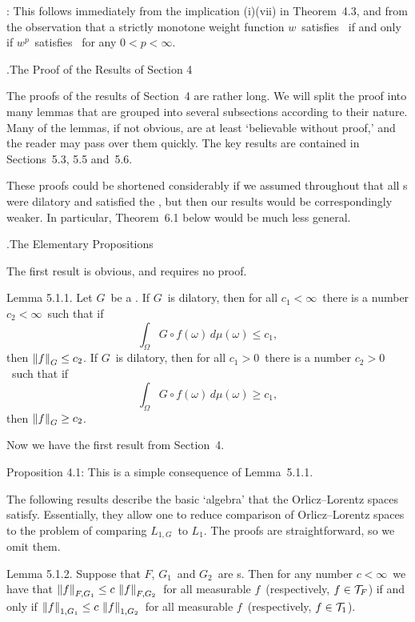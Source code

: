\Proof: This follows immediately from the implication (i)\implies(vii) in
Theorem~4.3, and from the observation that a strictly monotone weight
function $w$\ satisfies \conditionL\ if and only if $w^p$\ satisfies
\conditionL\ for any $0<p<\infty$. 
\endproof

.\enspace The Proof of the Results of Section 4

The proofs of the results of Section~4 are rather long. We will split the proof
into many lemmas that are grouped into several subsections
according to their nature. Many of the lemmas, if not obvious, are at least
`believable without proof,' and the reader may pass over them quickly. The key
results are contained in Sections~5.3, 5.5 and~5.6.

These proofs could be shortened considerably if we assumed throughout
that all \phifunction s were dilatory and satisfied the \Deltacond, but
then our results would be correspondingly weaker.  In particular, Theorem~6.1
below would be much less general.

.\enspace The Elementary Propositions

The first result is obvious, and requires no proof.

\proclaim Lemma 5.1.1. Let $G$\ be a \phifunction.
\itemi If $G$\ is dilatory, then for all $c_1<\infty $\ there is a number
$c_2<\infty$\ such that if
$$ \int_\Omega G\circ f(\omega) \,d\mu(\omega) \le c_1 ,$$
then $\left\| f \right\|_G \le c_2$.
\itemii If $G$\ is dilatory, then for all $c_1>0 $\ there is a number
$c_2>0$\ such that if
$$ \int_\Omega G\circ f(\omega) \,d\mu(\omega) \ge c_1 ,$$
then $\left\| f \right\|_G \ge c_2$.

Now we have the first result from Section~4.

\Proofof Proposition 4.1: This is a simple consequence of Lemma~5.1.1.
\endproof

The following results describe the basic `algebra' that the Orlicz--Lorentz
spaces satisfy. Essentially, they allow one to reduce comparison of
Orlicz--Lorentz spaces to the problem of comparing $L_{1,G}$\ to $L_1$.
The proofs are straightforward, so we omit them.

\proclaim Lemma 5.1.2. Suppose that $F$, $G_1$\ and $G_2$\ are \phifunction s.
Then for any number $c<\infty$\ we have that $\left\| f \right\|_{F,G_1} \le c\, \left\| f \right\|_{F,G_2}$\ for all measurable $f$\ (respectively, $f\in\T_F$) if and only if
$\left\| f \right\|_{1,G_1} \le c\, \left\| f \right\|_{1,G_2}$\ for all measurable
$f$\ (respectively, $f\in\T_1$).

